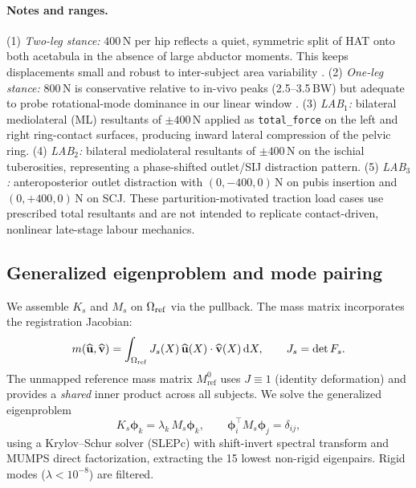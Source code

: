 \documentclass[11pt]{article}
\begin{document}
\paragraph{Notes and ranges.}
(1) \emph{Two-leg stance:} \(400\,\mathrm{N}\) per hip reflects a quiet, symmetric split of HAT onto both acetabula in the absence of large abductor moments. This keeps displacements small and robust to inter-subject area variability \citep{deLeva1996}. 
(2) \emph{One-leg stance:} \(800\,\mathrm{N}\) is conservative relative to in-vivo peaks (2.5--3.5\,BW) but adequate to probe rotational-mode dominance in our linear window \citep{Bergmann2001JBiomech,Kutzner2016PLOS}. 
(3) \emph{LAB$_1$:} bilateral mediolateral (ML) resultants of $\pm 400$\,N applied as \texttt{total\_force} on the left and right ring-contact surfaces, producing inward lateral compression of the pelvic ring. 
(4) \emph{LAB$_2$:} bilateral mediolateral resultants of $\pm 400$\,N on the ischial tuberosities, representing a phase-shifted outlet/SIJ distraction pattern.
(5) \emph{LAB$_3$:} anteroposterior outlet distraction with $(0,-400,0)$\,N on pubis insertion and $(0,+400,0)$\,N on SCJ.
These parturition-motivated traction load cases use prescribed total resultants and are not intended to replicate contact-driven, nonlinear late-stage labour mechanics.

\subsection{Generalized eigenproblem and mode pairing}\label{sec:evp}
We assemble $K_s$ and $M_s$ on $\Omega_{\rm ref}$ via the pullback.
The mass matrix incorporates the registration Jacobian:
\begin{equation}
m(\widehat{\mathbf u},\widehat{\mathbf v})
=\int_{\Omega_{\rm ref}} J_s(X)\,\widehat{\mathbf u}(X)\cdot\widehat{\mathbf v}(X)\,\mathrm dX,
\qquad J_s=\det F_s.
\end{equation}
The unmapped reference mass matrix $M_{\mathrm{ref}}^{0}$ uses $J\equiv 1$ (identity deformation) and provides a \emph{shared} inner product across all subjects.
We solve the generalized eigenproblem
\begin{equation}\label{eq:gep}
K_s\boldsymbol\phi_k=\lambda_k\,M_s\boldsymbol\phi_k, \qquad
\boldsymbol\phi_i^\top M_s \boldsymbol\phi_j=\delta_{ij},
\end{equation}
using a Krylov--Schur solver (SLEPc) with shift-invert spectral transform and MUMPS direct factorization, extracting the 15 lowest non-rigid eigenpairs.
Rigid modes ($\lambda<10^{-8}$) are filtered.
\end{document}
